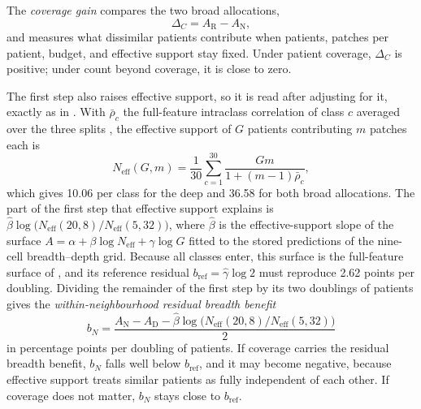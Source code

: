 \documentclass[11pt]{article}
\newcommand{\Neff}{N_{\mathrm{eff}}}
\begin{document}
The \emph{coverage gain} compares the two broad allocations,
\begin{equation}
 \Delta_C=A_{\mathrm R}-A_{\mathrm N},
 \label{eq:coverage-gain}
\end{equation}
\noindent and measures what dissimilar patients contribute when patients, patches per patient, budget, and effective support stay fixed. Under patient coverage, $\Delta_C$ is positive; under count beyond coverage, it is close to zero.

The first step also raises effective support, so it is read after adjusting for it, exactly as in \citet{queisler2026siteCoverage}. With $\bar\rho_c$ the full-feature intraclass correlation of class $c$ averaged over the three splits \citep{queisler2026multidirectionalRedundancy}, the effective support of $G$ patients contributing $m$ patches each is
\begin{equation}
 \Neff(G,m)=\frac{1}{30}\sum_{c=1}^{30}\frac{Gm}{1+(m-1)\bar\rho_c},
 \label{eq:neff}
\end{equation}
\noindent which gives 10.06 per class for the deep and 36.58 for both broad allocations. The part of the first step that effective support explains is $\hat\beta\log\bigl(\Neff(20,8)/\Neff(5,32)\bigr)$, where $\hat\beta$ is the effective-support slope of the surface $A=\alpha+\beta\log\Neff+\gamma\log G$ fitted to the stored predictions of the nine-cell breadth--depth grid. Because all classes enter, this surface is the full-feature surface of \citet{queisler2026multidirectionalRedundancy}, and its reference residual $b_{\mathrm{ref}}=\hat\gamma\log 2$ must reproduce 2.62 points per doubling. Dividing the remainder of the first step by its two doublings of patients gives the \emph{within-neighbourhood residual breadth benefit}
\begin{equation}
 b_N=\frac{A_{\mathrm N}-A_{\mathrm D}-\hat\beta\log\bigl(\Neff(20,8)/\Neff(5,32)\bigr)}{2}
 \label{eq:within-neighbourhood}
\end{equation}
\noindent in percentage points per doubling of patients. If coverage carries the residual breadth benefit, $b_N$ falls well below $b_{\mathrm{ref}}$, and it may become negative, because effective support treats similar patients as fully independent of each other. If coverage does not matter, $b_N$ stays close to $b_{\mathrm{ref}}$.
\end{document}
